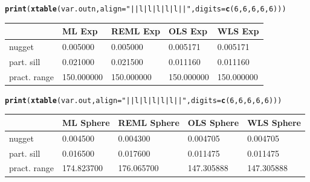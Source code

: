 \documentclass{article}\usepackage[]{graphicx}\usepackage[]{color}
\makeatletter
\newcommand{\hlnum}[1]{\textcolor[rgb]{0.686,0.059,0.569}{#1}}%
\newcommand{\hlstr}[1]{\textcolor[rgb]{0.192,0.494,0.8}{#1}}%
\newcommand{\hlstd}[1]{\textcolor[rgb]{0.345,0.345,0.345}{#1}}%
\newcommand{\hlkwc}[1]{\textcolor[rgb]{0.333,0.667,0.333}{#1}}%
\newcommand{\hlkwd}[1]{\textcolor[rgb]{0.737,0.353,0.396}{\textbf{#1}}}%
\newenvironment{kframe}{%
 \def\at@end@of@kframe{}%
 \ifinner\ifhmode%
  \def\at@end@of@kframe{\end{minipage}}%
  \begin{minipage}{\columnwidth}%
 \fi\fi%
 \def\FrameCommand##1{\hskip\@totalleftmargin \hskip-\fboxsep
 \colorbox{shadecolor}{##1}\hskip-\fboxsep
     \hskip-\linewidth \hskip-\@totalleftmargin \hskip\columnwidth}%
 \MakeFramed {\advance\hsize-\width
   \@totalleftmargin\z@ \linewidth\hsize
   \@setminipage}}%
 {\par\unskip\endMakeFramed%
 \at@end@of@kframe}
\makeatother
\begin{document}
\begin{enumerate}
\begin{enumerate}
\begin{kframe}
\begin{alltt}
\hlkwd{print}\hlstd{(}\hlkwd{xtable}\hlstd{(var.outn,} \hlkwc{align} \hlstd{=} \hlstr{"||l|l|l|l|l||"}\hlstd{,} \hlkwc{digits} \hlstd{=} \hlkwd{c}\hlstd{(}\hlnum{6}\hlstd{,}\hlnum{6}\hlstd{,}\hlnum{6}\hlstd{,}\hlnum{6}\hlstd{,}\hlnum{6}\hlstd{)))}
\end{alltt}
\end{kframe}%
\begin{table}[ht]
\centering
\begin{tabular}{||l|l|l|l|l||}
  \hline
 & ML Exp & REML Exp & OLS Exp & WLS Exp \\ 
  \hline
nugget & 0.005000 & 0.005000 & 0.005171 & 0.005171 \\ 
  part. sill & 0.021000 & 0.021500 & 0.011160 & 0.011160 \\ 
  pract. range & 150.000000 & 150.000000 & 150.000000 & 150.000000 \\ 
   \hline
\end{tabular}
\end{table}
\begin{kframe}\begin{alltt}
\hlkwd{print}\hlstd{(}\hlkwd{xtable}\hlstd{(var.out,} \hlkwc{align} \hlstd{=} \hlstr{"||l|l|l|l|l||"}\hlstd{,} \hlkwc{digits} \hlstd{=} \hlkwd{c}\hlstd{(}\hlnum{6}\hlstd{,}\hlnum{6}\hlstd{,}\hlnum{6}\hlstd{,}\hlnum{6}\hlstd{,}\hlnum{6}\hlstd{)))}
\end{alltt}
\end{kframe}%
\begin{table}[ht]
\centering
\begin{tabular}{||l|l|l|l|l||}
  \hline
 & ML Sphere & REML Sphere & OLS Sphere & WLS Sphere \\ 
  \hline
nugget & 0.004500 & 0.004300 & 0.004705 & 0.004705 \\ 
  part. sill & 0.016500 & 0.017600 & 0.011475 & 0.011475 \\ 
  pract. range & 174.823700 & 176.065700 & 147.305888 & 147.305888 \\ 
   \hline
\end{tabular}
\end{table}


\end{enumerate}
\end{enumerate}
\end{document}
